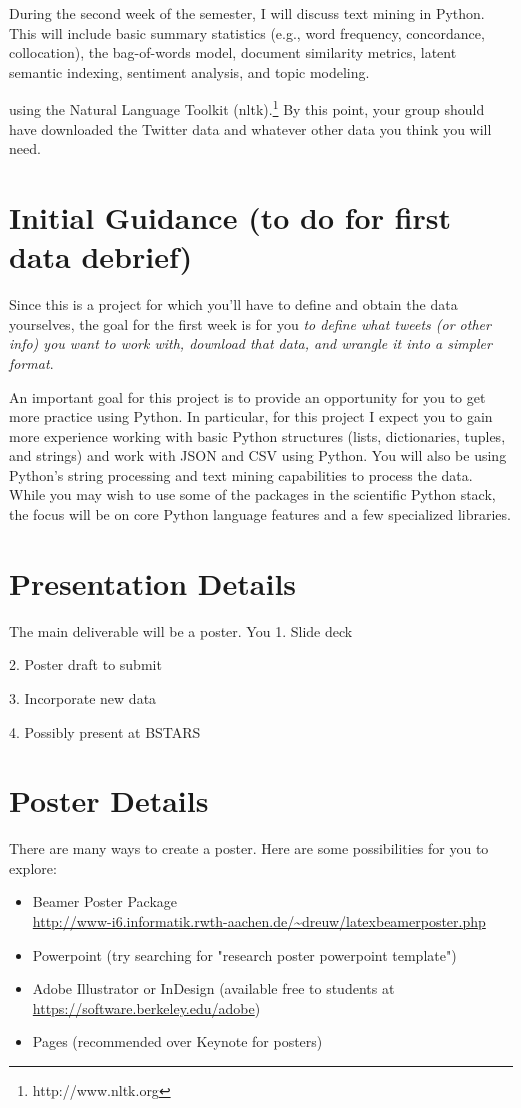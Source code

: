\documentclass[11pt, oneside]{article}   	%
\begin{document}
During the second week of the semester, I will discuss text mining in Python.
This will include basic summary statistics (e.g., word frequency, concordance,
collocation), the bag-of-words model, document similarity metrics, latent
semantic indexing, sentiment analysis, and topic modeling.  

using the Natural
Language Toolkit (nltk).\footnote{http://www.nltk.org} By this point, your
group should have downloaded the Twitter data and whatever other data you
think you will need.  

\section{Initial Guidance (to do for first data debrief)}

Since this is a project for which you'll have to define and obtain the data
yourselves, the goal for the first week is for you \emph{to define what tweets
(or other info) you want to work with, download that data, and wrangle it into
a simpler format}. 

An important goal for this project is to provide an opportunity for you to get
more practice using Python.  In particular, for this project I expect you to
gain more experience working with basic Python structures (lists, dictionaries,
tuples, and strings) and work with JSON and CSV using Python.  You will also be
using Python's string processing and text mining capabilities to process the
data.  While you may wish to use some of the packages in the scientific Python
stack, the focus will be on core Python language features and a few specialized
libraries.


\section{Presentation Details}

The main deliverable will be a poster.  You 
1. Slide deck

2. Poster draft to submit

3. Incorporate new data

4. Possibly present at BSTARS

\section{Poster Details}

There are many ways to create a poster. Here are some possibilities for you to explore:
\begin{itemize}
\item Beamer Poster Package\\
 \url{http://www-i6.informatik.rwth-aachen.de/~dreuw/latexbeamerposter.php}
\item Powerpoint (try searching for "research poster powerpoint template")
\item Adobe Illustrator or InDesign (available free to students at \url{https://software.berkeley.edu/adobe})
\item Pages (recommended over Keynote for posters)
\end{itemize}
\end{document}
